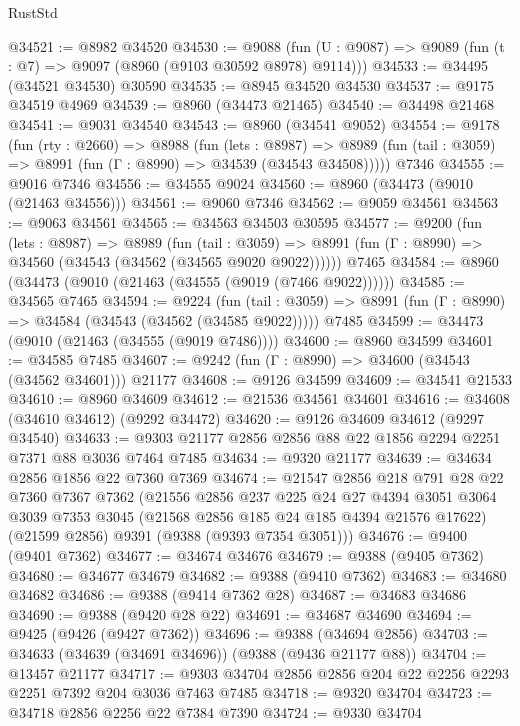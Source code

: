 \begin{lexlean}{RustStd}
\begin{coremodule}
@34521 := @8982 @34520
@34530 := @9088
    (fun (U : @9087) => @9089 (fun (t : @7) => @9097 (@8960 (@9103 @30592 @8978) @9114)))
@34533 := @34495 (@34521 @34530) @30590
@34535 := @8945 @34520 @34530
@34537 := @9175 @34519 @4969
@34539 := @8960 (@34473 @21465)
@34540 := @34498 @21468
@34541 := @9031 @34540
@34543 := @8960 (@34541 @9052)
@34554 := @9178
    (fun (rty : @2660) =>
    @8988
      (fun (lets : @8987) =>
      @8989 (fun (tail : @3059) => @8991 (fun (Γ : @8990) => @34539 (@34543 @34508)))))
    @7346
@34555 := @9016 @7346
@34556 := @34555 @9024
@34560 := @8960 (@34473 (@9010 (@21463 @34556)))
@34561 := @9060 @7346
@34562 := @9059 @34561
@34563 := @9063 @34561
@34565 := @34563 @34503 @30595
@34577 := @9200
    (fun (lets : @8987) =>
    @8989
      (fun (tail : @3059) =>
      @8991 (fun (Γ : @8990) => @34560 (@34543 (@34562 (@34565 @9020 @9022))))))
    @7465
@34584 := @8960 (@34473 (@9010 (@21463 (@34555 (@9019 (@7466 @9022))))))
@34585 := @34565 @7465
@34594 := @9224
    (fun (tail : @3059) => @8991 (fun (Γ : @8990) => @34584 (@34543 (@34562 (@34585 @9022)))))
    @7485
@34599 := @34473 (@9010 (@21463 (@34555 (@9019 @7486))))
@34600 := @8960 @34599
@34601 := @34585 @7485
@34607 := @9242 (fun (Γ : @8990) => @34600 (@34543 (@34562 @34601))) @21177
@34608 := @9126 @34599
@34609 := @34541 @21533
@34610 := @8960 @34609
@34612 := @21536 @34561 @34601
@34616 := @34608 (@34610 @34612) (@9292 @34472)
@34620 := @9126 @34609 @34612 (@9297 @34540)
@34633 := @9303 @21177 @2856 @2856 @88 @22 @1856 @2294 @2251 @7371 @88 @3036 @7464 @7485
@34634 := @9320 @21177
@34639 := @34634 @2856 @1856 @22 @7360 @7369
@34674 := @21547
    @2856
    @218
    @791
    @28
    @22
    @7360
    @7367
    @7362
    (@21556
      @2856
      @237
      @225
      @24
      @27
      @4394
      @3051
      @3064
      @3039
      @7353
      @3045
      (@21568 @2856 @185 @24 @185 @4394 @21576 @17622)
      (@21599 @2856)
      @9391
      (@9388 (@9393 @7354 @3051)))
@34676 := @9400 (@9401 @7362)
@34677 := @34674 @34676
@34679 := @9388 (@9405 @7362)
@34680 := @34677 @34679
@34682 := @9388 (@9410 @7362)
@34683 := @34680 @34682
@34686 := @9388 (@9414 @7362 @28)
@34687 := @34683 @34686
@34690 := @9388 (@9420 @28 @22)
@34691 := @34687 @34690
@34694 := @9425 (@9426 (@9427 @7362))
@34696 := @9388 (@34694 @2856)
@34703 := @34633 (@34639 (@34691 @34696)) (@9388 (@9436 @21177 @88))
@34704 := @13457 @21177
@34717 := @9303 @34704 @2856 @2856 @204 @22 @2256 @2293 @2251 @7392 @204 @3036 @7463 @7485
@34718 := @9320 @34704
@34723 := @34718 @2856 @2256 @22 @7384 @7390
@34724 := @9330 @34704

\end{coremodule}
\end{lexlean}
